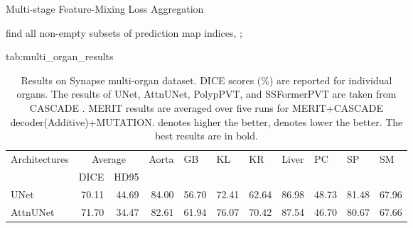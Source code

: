 \documentclass{midl}
\begin{document}
\begin{algorithm2e}
\caption{Multi-stage Feature-Mixing Loss Aggregation}
\label{alg:msfmla}
\LinesNumbered
{}
\;
 find all non-empty subsets of prediction map indices, ;
\end{algorithm2e}

\begin{table*}[t]
\centering
\floatconts
{tab:multi_organ_results}
{\caption{Results on Synapse multi-organ dataset. DICE scores (\%) are reported for individual organs. The results of UNet, AttnUNet, PolypPVT, and SSFormerPVT are taken from CASCADE \cite{rahman2023medical}. MERIT results are averaged over five runs for MERIT+CASCADE \textcolor{black}{decoder}(Additive)+MUTATION.  denotes higher the better,  denotes lower the better. The best results are in bold.}
\vspace{-0.5cm}
} {\begin{adjustbox}{width=1\textwidth}
{\begin{tabular}{lrrrrrrrrrr}
\toprule
\multirow{2}{*}{Architectures} & \multicolumn{2}{c}{Average}                                                                                     & \multicolumn{1}{l}{\multirow{2}{*}{Aorta}} & \multicolumn{1}{l}{\multirow{2}{*}{GB}} & \multicolumn{1}{l}{\multirow{2}{*}{KL}} & \multicolumn{1}{l}{\multirow{2}{*}{KR}} & \multicolumn{1}{l}{\multirow{2}{*}{Liver}} & \multicolumn{1}{l}{\multirow{2}{*}{PC}} & \multicolumn{1}{l}{\multirow{2}{*}{SP}} & \multicolumn{1}{l}{\multirow{2}{*}{SM}} \\
                               & \multicolumn{1}{l}{DICE} & \multicolumn{1}{l}{HD95} &  \multicolumn{1}{l}{}                       & \multicolumn{1}{l}{}                    & \multicolumn{1}{l}{}                         & \multicolumn{1}{l}{}                         & \multicolumn{1}{l}{}                       & \multicolumn{1}{l}{}                    & \multicolumn{1}{l}{}                    & \multicolumn{1}{l}{}                    \\
\midrule
UNet \cite{ronneberger2015u}     &      70.11      &    44.69 
    &   84.00   &      56.70   &       72.41  &       62.64  &      86.98   &     48.73   &      81.48   &     67.96
    \\
AttnUNet \cite{oktay2018attention}    &  71.70     &  34.47 
     &  82.61       &  61.94        &  76.07   &  70.42  
    &  87.54        &  46.70   &  80.67      &  67.66


\end{tabular}}
\end{adjustbox}}
\end{table*}
\end{document}
